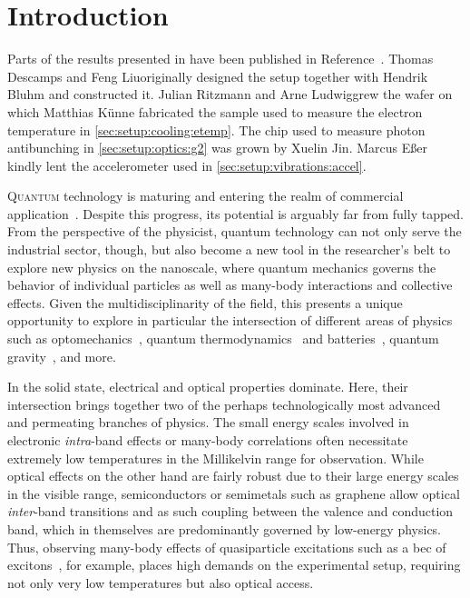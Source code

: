 \chapter{Introduction}\label{ch:setup:introduction}

\begin{partcontribs}
    Parts of the results presented in \thispart have been published in Reference~.
    Thomas Descamps and Feng Liu\sidenotemark[a] originally designed the setup together with Hendrik Bluhm\sidenote[b]{\RWTHFZJ} and constructed it.
    Julian Ritzmann\sidenote[c]{\RUB} and Arne Ludwig\sidenotemark[c] grew the wafer on which Matthias Künne fabricated the sample used to measure the electron temperature in \cref{sec:setup:cooling:etemp}.
    The chip used to measure photon antibunching in \cref{sec:setup:optics:g2} was grown by Xuelin Jin.\sidenote[d]{\FZJ}
    Marcus Eßer\sidenote[e]{\RWTH} kindly lent the accelerometer used in \cref{sec:setup:vibrations:accel}.
\end{partcontribs}

\lettrine[lines=3,lhang=0.33,loversize=0.25,depth=1]{Q}{uantum} technology is maturing and entering the realm of commercial application~\cite{Schleich2016,Mohseni2017,QTBMBF,QTCEN,QTEU}.
Despite this progress, its potential is arguably far from fully tapped.
From the perspective of the physicist, quantum technology can not only serve the industrial sector, though, but also become a new tool in the researcher's belt to explore new physics on the nanoscale, where quantum mechanics governs the behavior of individual particles as well as many-body interactions and collective effects.
Given the multidisciplinarity of the field, this presents a unique opportunity to explore in particular the intersection of different areas of physics such as optomechanics~\cite{Aspelmeyer2014,Barzanjeh2022}, quantum thermodynamics~\cite{Goold2016,Deffner2019,Cangemi2024} and batteries~\cite{Campaioli2024}, quantum gravity~\cite{Degen2017,Bass2024}, and more.

In the solid state, electrical and optical properties dominate.
Here, their intersection brings together two of the perhaps technologically most advanced and permeating branches of physics.
The small energy scales involved in electronic \emph{intra}-band effects or many-body correlations often necessitate extremely low temperatures in the Millikelvin range for observation.
While optical effects on the other hand are fairly robust due to their large energy scales in the visible range,
semiconductors or semimetals such as graphene allow optical \emph{inter}-band transitions and as such coupling between the valence and conduction band, which in themselves are predominantly governed by low-energy physics.
Thus, observing many-body effects of quasiparticle excitations such as a \gls{bec} of excitons~\cite{Kohn1970,High2012,Combescot2017,Morita2022,Zhang2024}, for example, places high demands on the experimental setup, requiring not only very low temperatures but also optical access.

